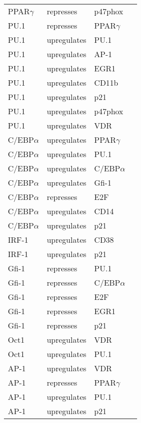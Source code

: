 \begin{center}
\begin{scriptsize}
\begin{supertabular}{|p{3cm}|p{3cm}|p{3cm}|p{3cm}|}
PPAR$\gamma$ &  represses & p47phox & \cite{Von-Knethen2002}\\
PU.1 &  represses & PPAR$\gamma$ & \cite{Dispirito2013}\\
PU.1 &  upregulates & PU.1 & \cite{Chen1995}\\
PU.1 &  upregulates & AP-1 & \cite{Steidl2006}\\
PU.1 &  upregulates & EGR1 & \cite{Laslo2006}\\
PU.1 &  upregulates & CD11b & \cite{Pahl1993}\\
PU.1 &  upregulates & p21 & \cite{Yuki2013}\\
PU.1 &  upregulates & p47phox & \cite{Li1999}\\
PU.1 &  upregulates & VDR & \cite{Gobel2009}\\
C/EBP$\alpha$ &  upregulates & PPAR$\gamma$ & \cite{Rosen2002}\\
C/EBP$\alpha$ &  upregulates & PU.1 & \cite{Dahl2003}\\
C/EBP$\alpha$ &  upregulates & C/EBP$\alpha$ & \cite{Timchenko1995}\\
C/EBP$\alpha$ &  upregulates & Gfi-1 & \cite{Lidonnici2010}\\
C/EBP$\alpha$ &  represses & E2F & \cite{DAlo2003}\\
C/EBP$\alpha$ &  upregulates & CD14 & \cite{Pan1999}\\
C/EBP$\alpha$ &  upregulates & p21 & \cite{Harris2001}\\
IRF-1 &  upregulates & CD38 & \cite{Bauvois1999}\\
IRF-1 &  upregulates & p21 & \cite{Passioura2005}\\
Gfi-1 &  represses & PU.1 & \cite{Dahl2007}\\
Gfi-1 &  represses & C/EBP$\alpha$ & \cite{Duan2003}\\
Gfi-1 &  represses & E2F & \cite{Duan2003}\\
Gfi-1 &  represses & EGR1 & \cite{Laslo2006}\\
Gfi-1 &  represses & p21 & \cite{Duan2003}\\
Oct1 &  upregulates & VDR & \cite{Liu1994}\\
Oct1 &  upregulates & PU.1 & \cite{Chen1996}\\
AP-1 &  upregulates & VDR &  \cite{Liu1994}\\
AP-1 &  represses & PPAR$\gamma$  & \cite{Delerive1999}\\
AP-1 &  upregulates & PU.1 &  \cite{Behre1999}\\
AP-1 &  upregulates & p21 &  \cite{Kardassis1999}\\

\end{supertabular}
\end{scriptsize}
\end{center}
